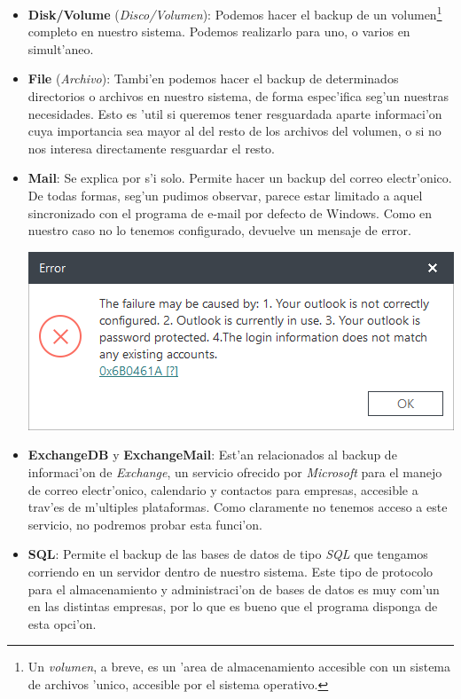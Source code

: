 \documentclass[11pt]{article}
\begin{document}
	\begin{itemize}
		\item \textbf{Disk/Volume} (\textit{Disco/Volumen}): Podemos hacer el backup de un volumen\footnote{Un \textit{volumen}, a breve, es un 'area de almacenamiento accesible con un sistema de archivos 'unico, accesible por el sistema operativo.} completo en nuestro sistema. Podemos realizarlo para uno, o varios en simult'aneo.
		\item \textbf{File} (\textit{Archivo}): Tambi'en podemos hacer el backup de determinados directorios o archivos en nuestro sistema, de forma espec'ifica seg'un nuestras necesidades. Esto es 'util si queremos tener resguardada aparte informaci'on cuya importancia sea mayor al del resto de los archivos del volumen, o si no nos interesa directamente resguardar el resto.
		\item \textbf{Mail}: Se explica por s'i solo. Permite hacer un backup del correo electr'onico. De todas formas, seg'un pudimos observar, parece estar limitado a aquel sincronizado con el programa de e-mail por defecto de Windows. Como en nuestro caso no lo tenemos configurado, devuelve un mensaje de error. \vspace{-7pt}
		
		\begin{center}
			\begin{minipage}{.6\linewidth}
				\centering
				\captionsetup{justification=centering}
				\includegraphics[width=.9\linewidth]{Images/easeus/use_mailerr}
			\end{minipage}
		\end{center}\vspace{3pt}
		
		\item \textbf{ExchangeDB} y \textbf{ExchangeMail}: Est'an relacionados al backup de informaci'on de \textit{Exchange}, un servicio ofrecido por \textit{Microsoft} para el manejo de correo electr'onico, calendario y contactos para empresas, accesible a trav'es de m'ultiples plataformas. Como claramente no tenemos acceso a este servicio, no podremos probar esta funci'on.
		\item \textbf{SQL}: Permite el backup de las bases de datos de tipo \textit{SQL} que tengamos corriendo en un servidor dentro de nuestro sistema. Este tipo de protocolo para el almacenamiento y administraci'on de bases de datos es muy com'un en las distintas empresas, por lo que es bueno que el programa disponga de esta opci'on.
	\end{itemize}
	
\end{document}
